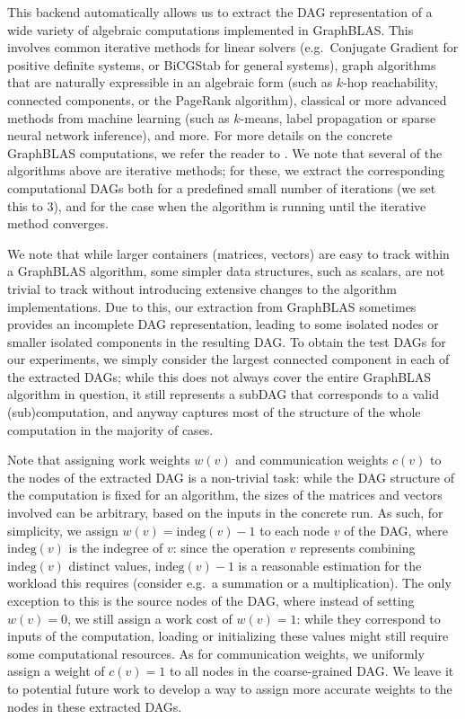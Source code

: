 \documentclass[sigconf,nonacm]{acmart}
\begin{document}
This backend automatically allows us to extract the DAG representation of a wide variety of algebraic computations implemented in GraphBLAS. This involves common iterative methods for linear solvers (e.g.\ Conjugate Gradient for positive definite systems, or BiCGStab for general systems), graph algorithms that are naturally expressible in an algebraic form (such as $k$-hop reachability, connected components, or the PageRank algorithm), classical or more advanced methods from machine learning (such as $k$-means, label propagation or sparse neural network inference), and more. For more details on the concrete GraphBLAS computations, we refer the reader to \cite{alp1}. We note that several of the algorithms above are iterative methods; for these, we extract the corresponding computational DAGs both for a predefined small number of iterations (we set this to $3$), and for the case when the algorithm is running until the iterative method converges. 

We note that while larger containers (matrices, vectors) are easy to track within a GraphBLAS algorithm, some simpler data structures, such as scalars, are not trivial to track without introducing extensive changes to the algorithm implementations. Due to this, our extraction from GraphBLAS sometimes provides an incomplete DAG representation, leading to some isolated nodes or smaller isolated components in the resulting DAG. To obtain the test DAGs for our experiments, we simply consider the largest connected component in each of the extracted DAGs; while this does not always cover the entire GraphBLAS algorithm in question, it still represents a subDAG that corresponds to a valid (sub)computation, and anyway captures most of the structure of the whole computation in the majority of cases.

Note that assigning work weights $w(v)$ and communication weights $c(v)$ to the nodes of the extracted DAG is a non-trivial task: while the DAG structure of the computation is fixed for an algorithm, the sizes of the matrices and vectors involved can be arbitrary, based on the inputs in the concrete run. As such, for simplicity, we assign $w(v)=\text{indeg}(v)-1$ to each node $v$ of the DAG, where $\text{indeg}(v)$ is the indegree of $v$: since the operation $v$ represents combining $\text{indeg}(v)$ distinct values, $\text{indeg}(v)-1$ is a reasonable estimation for the workload this requires (consider e.g.\ a summation or a multiplication). The only exception to this is the source nodes of the DAG, where instead of setting $w(v)=0$, we still assign a work cost of $w(v)=1$: while they correspond to inputs of the computation, loading or initializing these values might still require some computational resources. As for communication weights, we uniformly assign a weight of $c(v)=1$ to all nodes in the coarse-grained DAG. We leave it to potential future work to develop a way to assign more accurate weights to the nodes in these extracted DAGs.
\end{document}
